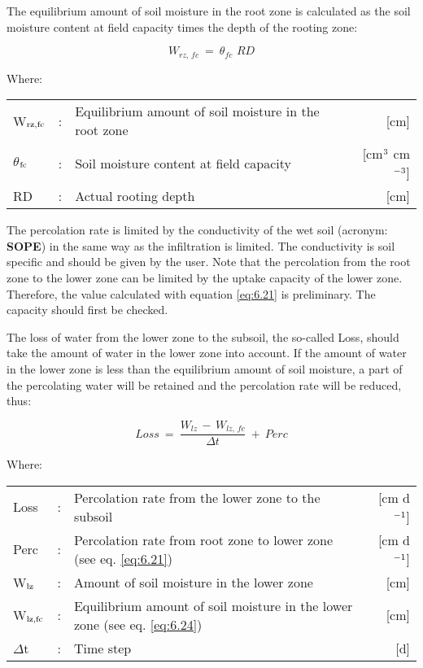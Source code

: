 The equilibrium amount of soil moisture in the root zone is calculated as the soil
moisture content at field capacity times the depth of the rooting zone:

\begin{equation}
\label{eq:6.22}
W _{rz,\, fc} ~=~ \theta  _{fc} \,\, RD
\end{equation}

Where:\\[5pt]
\begin{tabularx}{\textwidth}{llXr}
	W$_{{\rm rz,fc}}$ &:& Equilibrium amount of soil moisture in the root zone  & [cm]\\
	$\theta$$_{{\rm fc}}$ &:& Soil moisture content at field capacity  & 
	[cm$^{{\rm 3}}$ cm$^{{\rm -3}}$]\\
	RD &:& Actual rooting depth  & [cm]\\
\end{tabularx}

The percolation rate is limited by the conductivity of the wet soil (acronym: {\bf SOPE}) in the
same way as the infiltration is limited. The conductivity is soil specific and should be
given by the user. Note that the percolation from the root zone to the lower zone can be
limited by the uptake capacity of the lower zone. Therefore, the value calculated with 
equation \ref{eq:6.21} is preliminary. The capacity should first be checked.

The loss of water from the lower zone to the subsoil, the so-called Loss, should take the
amount of water in the lower zone into account. If the amount of water in the lower zone
is less than the equilibrium amount of soil moisture, a part of the percolating water will
be retained and the percolation rate will be reduced, thus:

\begin{equation}
\label{eq:6.23}
Loss ~=~{\frac{W _{lz} \, -\, W _{lz,\, fc} }{\Delta t}} ~+~ Perc
\end{equation}

Where:\\[5pt]
\begin{tabularx}{\textwidth}{llXr}
	Loss &:& Percolation rate from the lower zone to the subsoil   & [cm d$^{{\rm -1}}$]\\
	Perc &:& Percolation rate from root zone to lower zone (see eq. \ref{eq:6.21})  & [cm d$^{{\rm -1}}$]\\
	W$_{{\rm lz}}$ &:& Amount of soil moisture in the lower zone & [cm]\\
	W$_{{\rm lz,fc}}$ &:& Equilibrium amount of soil moisture in the
	lower zone (see eq. \ref{eq:6.24})  & [cm]\\
	$\Delta$t &:& Time step   & [d]\\
\end{tabularx}

